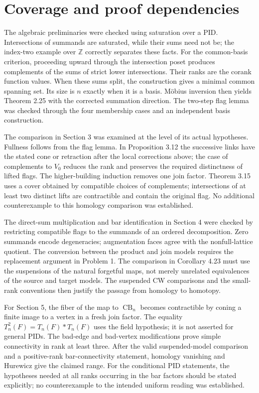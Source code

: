 \documentclass[10pt]{article}
\begin{document}
\section*{Coverage and proof dependencies}
The algebraic preliminaries were checked using saturation over a PID. Intersections of summands are saturated, while their sums need not be; the index-two example over \(\mathbb Z\) correctly separates these facts. For the common-basis criterion, proceeding upward through the intersection poset produces complements of the sums of strict lower intersections. Their ranks are the corank function values. When these sums split, the construction gives a minimal common spanning set. Its size is \(n\) exactly when it is a basis. Möbius inversion then yields Theorem 2.25 with the corrected summation direction. The two-step flag lemma was checked through the four membership cases and an independent basis construction.\par
The comparison in Section 3 was examined at the level of its actual hypotheses. Fullness follows from the flag lemma. In Proposition 3.12 the successive links have the stated cone or retraction after the local corrections above; the case of complements to \(V_0\) reduces the rank and preserves the required distinctness of lifted flags. The higher-building induction removes one join factor. Theorem 3.15 uses a cover obtained by compatible choices of complements; intersections of at least two distinct lifts are contractible and contain the original flag. No additional counterexample to this homology comparison was established.\par
The direct-sum multiplication and bar identification in Section 4 were checked by restricting compatible flags to the summands of an ordered decomposition. Zero summands encode degeneracies; augmentation faces agree with the nonfull-lattice quotient. The conversion between the product and join models requires the replacement argument in Problem 1. The comparison in Corollary 4.23 must use the suspensions of the natural forgetful maps, not merely unrelated equivalences of the source and target models. The suspended CW comparisons and the small-rank conventions then justify the passage from homology to homotopy.\par
For Section 5, the fiber of the map to \(\operatorname{CB}_n\) becomes contractible by coning a finite image to a vertex in a fresh join factor. The equality \(T_n^2(F)=T_n(F)*T_n(F)\) uses the field hypothesis; it is not asserted for general PIDs. The bad-edge and bad-vertex modifications prove simple connectivity in rank at least three. After the valid suspended-model comparison and a positive-rank bar-connectivity statement, homology vanishing and Hurewicz give the claimed range. For the conditional PID statements, the hypotheses needed at all ranks occurring in the bar factors should be stated explicitly; no counterexample to the intended uniform reading was established.\par
\end{document}
